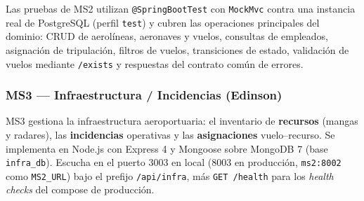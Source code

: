 Las pruebas de MS2 utilizan \texttt{@SpringBootTest} con \texttt{MockMvc}
contra una instancia real de PostgreSQL (perfil \texttt{test}) y cubren
las operaciones principales del dominio: CRUD de aerolíneas, aeronaves y
vuelos, consultas de empleados, asignación de tripulación, filtros de
vuelos, transiciones de estado, validación de vuelos mediante
\texttt{/exists} y respuestas del contrato común de errores.









\subsubsection{MS3 --- Infraestructura / Incidencias (Edinson)}
MS3 gestiona la infraestructura aeroportuaria: el inventario de
\textbf{recursos} (mangas y radares), las \textbf{incidencias}
operativas y las \textbf{asignaciones} vuelo--recurso. Se implementa en
Node.js con Express 4 y Mongoose sobre MongoDB 7 (base
\texttt{infra\_db}). Escucha en el puerto 3003 en local (8003 en
producción, \texttt{ms2:8002} como \texttt{MS2\_URL}) bajo el prefijo
\texttt{/api/infra}, más \texttt{GET /health} para los \emph{health
checks} del compose de producción.

